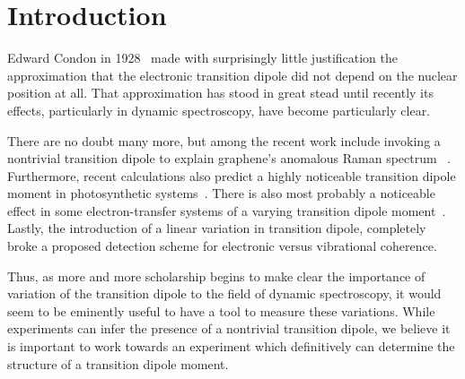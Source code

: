 \section{Introduction}
Edward Condon in 1928~\cite{Condon} made with surprisingly little justification the approximation that the electronic transition dipole did not depend on the nuclear position at all.  That approximation has stood in great stead until recently its effects, particularly in dynamic spectroscopy, have become particularly clear.

There are no doubt many more, but among the recent work include invoking a nontrivial transition dipole to explain graphene's anomalous Raman spectrum ~\cite{hellerGraphene}.  Furthermore, recent calculations also predict a highly noticeable transition dipole moment in photosynthetic systems~\cite{photosyntheticKappa}.  There is also most probably a noticeable effect in some electron-transfer systems of a varying transition dipole moment~\cite{MavrosNonCondon}.  Lastly, the introduction of a linear variation in transition dipole, completely broke a proposed detection scheme for electronic versus vibrational coherence.

Thus, as more and more scholarship begins to make clear the importance of variation of the transition dipole to the field of dynamic spectroscopy, it would seem to be eminently useful to have a tool to measure these variations.  While experiments can infer the presence of a nontrivial transition dipole, we believe it is important to work towards an experiment which definitively can determine the structure of a transition dipole moment.

